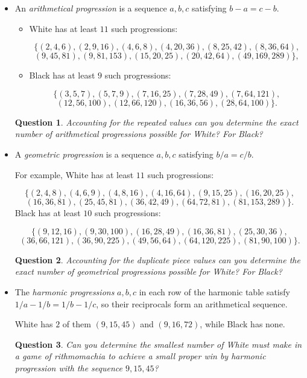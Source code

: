 \documentclass[12pt]{article}
\newtheorem{question}{Question}
\begin{document}
\begin{itemize}
\item
An {\it arithmetical progression} is a sequence $a,b,c$ satisfying $b-a=c-b$.

\begin{itemize}
\item
 White has at least $11$ such progressions:

\[
\{(2, 4, 6), (2, 9, 16), (4, 6, 8), (4, 20, 36), (8, 25, 42), (8, 36, 64),
\]
\[
(9, 45, 81), (9, 81, 153), (15, 20, 25), (20, 42, 64), (49, 169, 289)\},
\]
\item
Black has at least $9$ such progressions:

\[
\{(3, 5, 7), (5, 7, 9), (7, 16, 25), (7, 28, 49), (7, 64, 121),
\]
\[
(12, 56, 100), (12, 66, 120), (16, 36, 56), (28, 64, 100)
\}.
\]
\end{itemize}


\begin{question}
Accounting for the repeated values can you determine the
{\it exact} number of arithmetical progressions possible for
White? For Black?
\end{question}

\item
A {\it geometric progression} is a sequence $a,b,c$ 
satisfying $b/a=c/b$.

For example, White has at least $11$ such progressions:

\[
\{
(2, 4, 8), (4, 6, 9), (4, 8, 16), (4, 16, 64), (9, 15, 25), (16, 20, 25),
\]
\[
 (16, 36, 81), (25, 45, 81), (36, 42, 49), (64, 72, 81), (81, 153, 289)
\}.
\]
Black has at least $10$ such progressions:

\[
\{
(9, 12, 16), (9, 30, 100), (16, 28, 49), (16, 36, 81), (25, 30, 36),
\]
\[
(36, 66, 121), (36, 90, 225), (49, 56, 64), (64, 120, 225), (81, 90, 100)
\}.
\]

\begin{question}
Accounting for the duplicate piece values can you determine the
{\it exact} number of geometrical progressions possible for
White? For Black?
\end{question}

\item
The {\it harmonic progressions} $a,b,c$ in each row of the harmonic table
satisfy $1/a - 1/b = 1/b - 1/c$, so their reciprocals form an
arithmetical sequence.

White has $2$ of them $(9, 15, 45)$ and $(9, 16, 72)$,
while Black has none.

\begin{question}
Can you determine the smallest number of White must make in a game
of rithmomachia to achieve a small proper win by harmonic progression
with the
sequence $9,15,45$?
\end{question}
\end{itemize}
\end{document}
